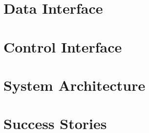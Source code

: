 \section{Data Interface}
\label{ascent_data}


\section{Control Interface}
\label{ascent_control}


\section{System Architecture}
\label{ascent_architecture}


\section{Success Stories}
\label{ascent_success}

